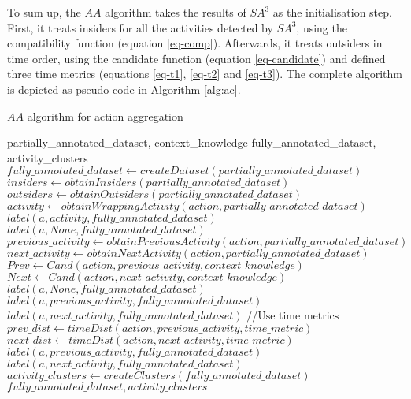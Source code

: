 To sum up, the $AA$ algorithm takes the results of $SA^3$ as the initialisation step. First, it treats insiders for all the activities detected by $SA^3$, using the compatibility function (equation \ref{eq-comp}). Afterwards, it treats outsiders in time order, using the candidate function (equation \ref{eq-candidate}) and defined three time metrics (equations \ref{eq-t1}, \ref{eq-t2} and \ref{eq-t3}). The complete algorithm is depicted as pseudo-code in Algorithm \ref{alg:ac}.

\begin{algorithm}
 \caption{$AA$ algorithm for action aggregation}
 \label{alg:ac}
 \begin{algorithmic}
 \REQUIRE partially\_annotated\_dataset, context\_knowledge
 \ENSURE fully\_annotated\_dataset, activity\_clusters
 \STATE $fully\_annotated\_dataset \leftarrow createDataset(partially\_annotated\_dataset)$
 \STATE $insiders \leftarrow obtainInsiders(partially\_annotated\_dataset)$
 \STATE $outsiders \leftarrow obtainOutsiders(partially\_annotated\_dataset)$ 
  \STATE $activity \leftarrow obtainWrappingActivity(action, partially\_annotated\_dataset)$
    \STATE $label(a, activity, fully\_annotated\_dataset)$
  \ELSE
    \STATE $label(a, None, fully\_annotated\_dataset)$
  \ENDIF
 \ENDFOR 
  \STATE $previous\_activity \leftarrow obtainPreviousActivity(action, partially\_annotated\_dataset)$
  \STATE $next\_activity \leftarrow obtainNextActivity(action, partially\_annotated\_dataset)$
  \STATE $Prev \leftarrow Cand(action, previous\_activity, context\_knowledge)$
  \STATE $Next \leftarrow Cand(action, next\_activity, context\_knowledge)$
    \STATE $label(a, None, fully\_annotated\_dataset)$
    \STATE $label(a, previous\_activity, fully\_annotated\_dataset)$
    \STATE $label(a, next\_activity, fully\_annotated\_dataset)$
    \STATE $// \text{Use time metrics}$
    \STATE $prev\_dist \leftarrow timeDist(action, previous\_activity, time\_metric)$
    \STATE $next\_dist \leftarrow timeDist(action, next\_activity, time\_metric)$
      \STATE $label(a, previous\_activity, fully\_annotated\_dataset)$
    \ELSE
      \STATE $label(a, next\_activity, fully\_annotated\_dataset)$
    \ENDIF
  \ENDIF  
 \ENDFOR
 \STATE $activity\_clusters \leftarrow createClusters(fully\_annotated\_dataset)$
 \RETURN $fully\_annotated\_dataset, activity\_clusters$
 \end{algorithmic}
\end{algorithm}

